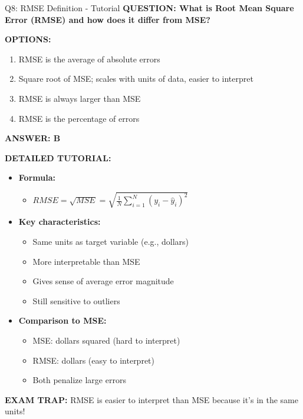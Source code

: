 \documentclass[8pt]{beamer}
\begin{document}
	\begin{frame}{Q8: RMSE Definition - Tutorial}
		\fontsize{6.5}{7.5}\selectfont
		\textbf{QUESTION: What is Root Mean Square Error (RMSE) and how does it differ from MSE?}
		
		\vspace{0.1cm}
		\textbf{OPTIONS:}
		\begin{enumerate}
			\item RMSE is the average of absolute errors
			\item Square root of MSE; scales with units of data, easier to interpret
			\item RMSE is always larger than MSE
			\item RMSE is the percentage of errors
		\end{enumerate}
		
		\vspace{0.1cm}
		\textcolor{myblue}{\textbf{ANSWER: B}}
		
		\vspace{0.1cm}
		\textbf{DETAILED TUTORIAL:}
		\begin{itemize}
			\item \textbf{Formula:}
			\begin{itemize}
				\item $RMSE = \sqrt{MSE} = \sqrt{\frac{1}{N}\sum_{i=1}^N (y_i - \hat{y}_i)^2}$
			\end{itemize}
			\item \textbf{Key characteristics:}
			\begin{itemize}
				\item Same units as target variable (e.g., dollars)
				\item More interpretable than MSE
				\item Gives sense of average error magnitude
				\item Still sensitive to outliers
			\end{itemize}
			\item \textbf{Comparison to MSE:}
			\begin{itemize}
				\item MSE: dollars squared (hard to interpret)
				\item RMSE: dollars (easy to interpret)
				\item Both penalize large errors
			\end{itemize}
		\end{itemize}
		
		\textcolor{myred}{\textbf{EXAM TRAP:}} RMSE is \textcolor{myblue}{easier to interpret} than MSE because it's in the same units!
	\end{frame}
	
\end{document}
